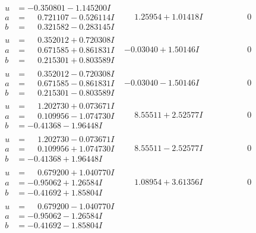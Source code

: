 \documentclass[1p]{elsarticle_modified}
\theoremstyle{definition}
\begin{document}
$$\begin{array}{c|c|c}
\begin{aligned}
u &= -0.350801 - 1.145200 I \\
a &= \phantom{-}0.721107 - 0.526114 I \\
b &= \phantom{-}0.321582 - 0.283145 I\end{aligned}
 & \phantom{-}1.25954 + 1.01418 I & \phantom{-0.000000 } 0 \\ \hline\begin{aligned}
u &= \phantom{-}0.352012 + 0.720308 I \\
a &= \phantom{-}0.671585 + 0.861831 I \\
b &= \phantom{-}0.215301 + 0.803589 I\end{aligned}
 & -0.03040 + 1.50146 I & \phantom{-0.000000 } 0 \\ \hline\begin{aligned}
u &= \phantom{-}0.352012 - 0.720308 I \\
a &= \phantom{-}0.671585 - 0.861831 I \\
b &= \phantom{-}0.215301 - 0.803589 I\end{aligned}
 & -0.03040 - 1.50146 I & \phantom{-0.000000 } 0 \\ \hline\begin{aligned}
u &= \phantom{-}1.202730 + 0.073671 I \\
a &= \phantom{-}0.109956 - 1.074730 I \\
b &= -0.41368 - 1.96448 I\end{aligned}
 & \phantom{-}8.55511 + 2.52577 I & \phantom{-0.000000 } 0 \\ \hline\begin{aligned}
u &= \phantom{-}1.202730 - 0.073671 I \\
a &= \phantom{-}0.109956 + 1.074730 I \\
b &= -0.41368 + 1.96448 I\end{aligned}
 & \phantom{-}8.55511 - 2.52577 I & \phantom{-0.000000 } 0 \\ \hline\begin{aligned}
u &= \phantom{-}0.679200 + 1.040770 I \\
a &= -0.95062 + 1.26584 I \\
b &= -0.41692 + 1.85804 I\end{aligned}
 & \phantom{-}1.08954 + 3.61356 I & \phantom{-0.000000 } 0 \\ \hline\begin{aligned}
u &= \phantom{-}0.679200 - 1.040770 I \\
a &= -0.95062 - 1.26584 I \\
b &= -0.41692 - 1.85804 I\end{aligned}

\end{array}$$
\end{document}
